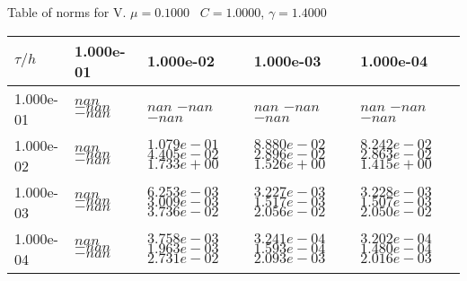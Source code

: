 \begin{center}
Table of norms for V. $\mu = 0.1000$ \, $C = 1.0000$, $\gamma = 1.4000$
  
\begin{tabular}{|p{1in}|p{1in}|p{1in}|p{1in}|p{1in}|} \hline
$\tau / h$ &1.000e-01 &1.000e-02 &1.000e-03 &1.000e-04 \\ \hline 
1.000e-01 & $nan$  $-nan$  $-nan$  & $nan$  $-nan$  $-nan$  & $nan$  $-nan$  $-nan$  & $nan$  $-nan$  $-nan$  \\ \hline 
1.000e-02 & $nan$  $-nan$  $-nan$  & $1.079e-01$  $4.405e-02$  $1.733e+00$  & $8.880e-02$  $2.896e-02$  $1.526e+00$  & $8.242e-02$  $2.863e-02$  $1.415e+00$  \\ \hline 
1.000e-03 & $nan$  $-nan$  $-nan$  & $6.253e-03$  $3.009e-03$  $3.736e-02$  & $3.227e-03$  $1.517e-03$  $2.056e-02$  & $3.228e-03$  $1.507e-03$  $2.050e-02$  \\ \hline 
1.000e-04 & $nan$  $-nan$  $-nan$  & $3.758e-03$  $1.963e-03$  $2.731e-02$  & $3.241e-04$  $1.593e-04$  $2.093e-03$  & $3.202e-04$  $1.480e-04$  $2.016e-03$  \\ \hline 

\end{tabular}\\[20pt]
\end{center}
